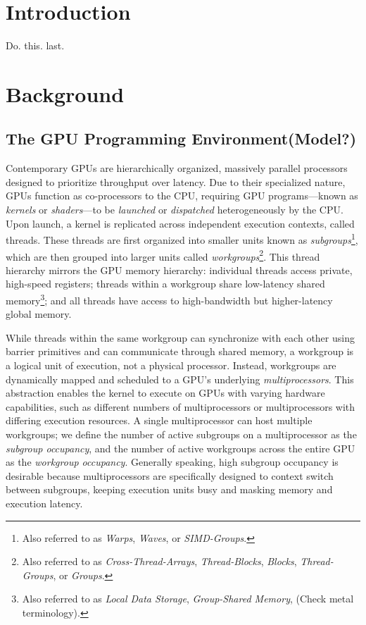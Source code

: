 \documentclass[sigconf]{acmart}
\begin{document}
\section{Introduction}
 Do. this. last.
 
\section{Background}
\subsection{The GPU Programming Environment(Model?)}
 Contemporary GPUs are hierarchically organized, massively parallel processors designed to prioritize throughput over latency. Due to their specialized nature, GPUs function as co-processors to the CPU, requiring GPU programs—known as \emph{kernels} or \emph{shaders}—to be \emph{launched} or \emph{dispatched} heterogeneously by the CPU. Upon launch, a kernel is replicated across independent execution contexts, called threads. These threads are first organized into smaller units known as \emph{subgroups}\footnote{Also referred to as \emph{Warps}, \emph{Waves}, or \emph{SIMD-Groups}.}, which are then grouped into larger units called \emph{workgroups}\footnote{Also referred to as \emph{Cross-Thread-Arrays}, \emph{Thread-Blocks}, \emph{Blocks}, \emph{Thread-Groups}, or \emph{Groups}.}. This thread hierarchy mirrors the GPU memory hierarchy: individual threads access private, high-speed registers; threads within a workgroup share low-latency shared memory\footnote{Also referred to as \emph{Local Data Storage}, \emph{Group-Shared Memory}, (Check metal terminology).}; and all threads have access to high-bandwidth but higher-latency global memory.

 While threads within the same workgroup can synchronize with each other using barrier primitives and can communicate through shared memory, a workgroup is a logical unit of execution, not a physical processor. Instead, workgroups are dynamically mapped and scheduled to a GPU's underlying \emph{multiprocessors}. This abstraction enables the kernel to execute on GPUs with varying hardware capabilities, such as different numbers of multiprocessors or multiprocessors with differing execution resources. A single multiprocessor can host multiple workgroups; we define the number of active subgroups on a multiprocessor as the \emph{subgroup occupancy}, and the number of active workgroups across the entire GPU as the \emph{workgroup occupancy}. Generally speaking, high subgroup occupancy is desirable because multiprocessors are specifically designed to context switch between subgroups, keeping execution units busy and masking memory and execution latency.
 
\end{document}
